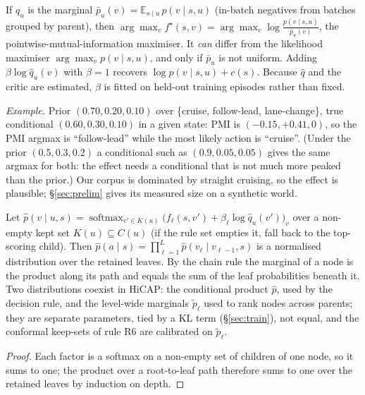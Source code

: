 \begin{corollary}\label{cor:bias}
If $q_u$ is the marginal $\bar p_u(v)=\mathbb E_{s\mid u}\,p(v\mid s,u)$ (in-batch negatives from batches grouped by parent), then
$\arg\max_v f^\star(s,v)=\arg\max_v\log\frac{p(v\mid s,u)}{\bar p_u(v)}$, the pointwise-mutual-information
maximiser. It \emph{can} differ from the likelihood maximiser $\arg\max_v p(v\mid s,u)$, and only if $\bar p_u$ is not uniform. Adding
$\beta\log\hat q_u(v)$ with $\beta=1$ recovers $\log p(v\mid s,u)+c(s)$. Because $\hat q$ and the critic are
estimated, $\beta$ is fitted on held-out training episodes rather than fixed.
\end{corollary}
\noindent\textit{Example.} Prior $(0.70,0.20,0.10)$ over \{cruise, follow-lead, lane-change\}, true conditional
$(0.60,0.30,0.10)$ in a given state: PMI is $(-0.15,+0.41,0)$, so the PMI argmax is ``follow-lead'' while the most
likely action is ``cruise''. (Under the prior $(0.5,0.3,0.2)$ a conditional such as $(0.9,0.05,0.05)$ gives the same argmax for both: the effect needs a conditional that is not much more peaked than the prior.)
Our corpus is dominated by straight cruising, so the effect is plausible; \S\ref{sec:prelim} gives its measured size on a synthetic world.

\begin{proposition}\label{prop:tree}
Let $\hat p(v\mid u,s)=\operatorname{softmax}_{v'\in K(u)}\big(f_\ell(s,v')+\beta_\ell\log\hat q_u(v')\big)_v$ over a non-empty kept set $K(u)\subseteq C(u)$ (if the rule set empties it, fall back to the top-scoring child). Then
$\hat p(a\mid s)=\prod_{\ell=1}^{L}\hat p(v_\ell\mid v_{\ell-1},s)$ is a normalised distribution over the
retained leaves. By the chain rule the marginal of a node is the product along its path and equals the sum of the leaf
probabilities beneath it. Two distributions coexist in HiCAP: the conditional product $\hat p$, used by the decision rule, and the level-wide marginals $\tilde p_\ell$ used to rank nodes across parents; they are separate parameters, tied by a KL term (\S\ref{sec:train}), not equal, and the conformal keep-sets of rule R6 are calibrated on $\tilde p_\ell$.
\end{proposition}
\begin{proof}
Each factor is a softmax on a non-empty set of children of one node, so it sums to one; the product over a root-to-leaf
path therefore sums to one over the retained leaves by induction on depth.\qedhere
\end{proof}

